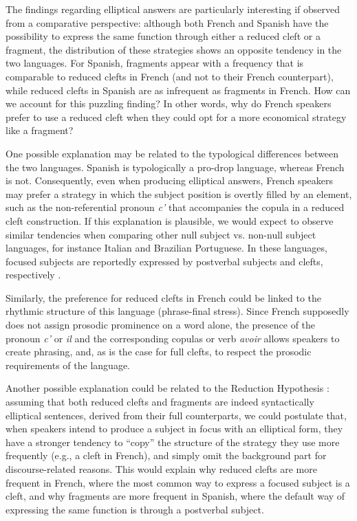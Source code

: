 {The findings regarding elliptical answers are particularly interesting if observed from a comparative perspective: although both French and Spanish have the possibility to express the same function through either a reduced cleft or a fragment, the distribution of these strategies shows an opposite tendency in the two languages. For Spanish, fragments appear with a frequency that is comparable to reduced clefts in French (and not to their French counterpart), while reduced clefts in Spanish are as infrequent as fragments in French.
How can we account for this puzzling finding? In other words, why do French speakers prefer to use a reduced cleft when they could opt for a more economical strategy like a fragment?

One possible explanation may be related to the typological differences between the two languages. Spanish is typologically a pro-drop language, whereas French is not. Consequently, even when producing elliptical answers, French speakers may prefer a strategy in which the subject position is overtly filled by an element, such as the non-referential pronoun \textit{c'} that accompanies the copula in a reduced cleft construction. If this explanation is plausible, we would expect to observe similar tendencies when comparing other null subject vs. non-null subject languages, for instance Italian and Brazilian Portuguese. In these languages, focused subjects are reportedly expressed by postverbal subjects and clefts, respectively \parencite{kato2006focus}.

Similarly, the preference for reduced clefts in French could be linked to the rhythmic structure of this language (phrase-final stress). Since French supposedly does not assign prosodic prominence on a word alone, the presence of the pronoun \textit{c'} or \textit{il} and the corresponding copulas or verb \textit{avoir} allows speakers to create phrasing, and, as is the case for full clefts, to respect the prosodic requirements of the language.

Another possible explanation could be related to the Reduction Hypothesis \parencite{jenkins2017cleft}: assuming that both reduced clefts and fragments are indeed syntactically elliptical sentences, derived from their full counterparts, we could postulate that, when speakers intend to produce a subject in focus with an elliptical form, they have a stronger tendency to ``copy” the structure of the strategy they use more frequently (e.g., a cleft in French), and simply omit the background part for discourse-related reasons. This would explain why reduced clefts are more frequent in French, where the most common way to express a focused subject is a cleft, and why fragments are more frequent in Spanish, where the default way of expressing the same function is through a postverbal subject.

}
